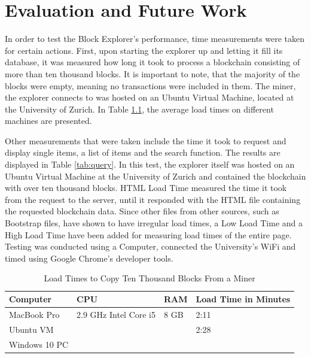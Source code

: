 \chapter{Evaluation and Future Work}

In order to test the Block Explorer's performance, time measurements were taken for certain actions. First, upon starting the explorer up and letting it fill its database, it was measured how long it took to process a blockchain consisting of more than ten thousand blocks. It is important to note, that the majority of the blocks were empty, meaning no transactions were included in them. The miner, the explorer connects to was hosted on an Ubuntu Virtual Machine, located at the University of Zurich. In Table \ref{tab:load}, the average load times on different machines are presented.

Other measurements that were taken include the time it took to request and display single items, a list of items and the search function. The results are displayed in Table \ref{tab:query}. In this test, the explorer itself was hosted on an Ubuntu \cite{ubuntu} Virtual Machine at the University of Zurich and contained the blockchain with over ten thousand blocks. HTML Load Time measured the time it took from the request to the server, until it responded with the HTML file containing the requested blockchain data. Since other files from other sources, such as Bootstrap files, have shown to have irregular load times, a Low Load Time and a High Load Time have been added for measuring load times of the entire page. Testing was conducted using a Computer, connected the University's WiFi and timed using Google Chrome's \cite{chrome} developer tools.

\begin{table}[]
\centering
\caption{Load Times to Copy Ten Thousand Blocks From a Miner}
\label{tab:load}
\begin{tabular}{|l|l|l|l|}
\hline
\textbf{Computer} & \textbf{CPU} & \textbf{RAM} & \textbf{Load Time in Minutes} \\ \hline
MacBook Pro & 2.9 GHz Intel Core i5 & 8 GB & 2:11 \\ \hline
Ubuntu VM &  &  & 2:28 \\ \hline
Windows 10 PC &  &  &  \\ \hline
\end{tabular}
\end{table}

